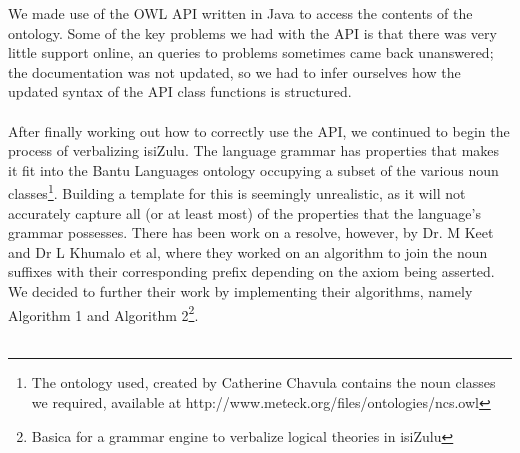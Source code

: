 We made use of the OWL API written in Java to access the contents of the ontology. Some of the key problems we had with the API is that there was very little support online, an queries to problems sometimes came back unanswered; the documentation was not updated, so we had to infer ourselves how the updated syntax of the API class functions is structured.\\
\\
After finally working out how to correctly use the API, we continued to begin the process of verbalizing isiZulu. The language grammar has properties that makes it fit into the Bantu Languages ontology occupying a subset of the various noun classes\footnote{The ontology used, created by Catherine Chavula contains the noun classes we required, available at http://www.meteck.org/files/ontologies/ncs.owl}. Building a template for this is seemingly unrealistic, as it will not accurately capture all (or at least most) of the properties that the language's grammar possesses. There has been work on a resolve, however, by Dr. M Keet and Dr L Khumalo et al, where they worked on an algorithm to join the noun suffixes with their corresponding prefix depending on the axiom being asserted. We decided to further their work by implementing their algorithms, namely Algorithm 1 and Algorithm 2\footnote{Basica for a grammar engine to verbalize logical theories in isiZulu}.\\
\\
